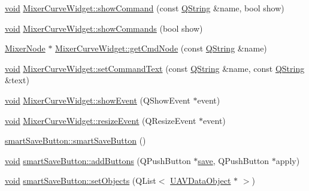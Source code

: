 \begin{DoxyCompactItemize}
\item 
\hyperlink{group___u_a_v_objects_plugin_ga444cf2ff3f0ecbe028adce838d373f5c}{void} \hyperlink{group___u_a_v_object_widget_utils_gab84993af05bfcca9d61a15a48ff85a73}{\-Mixer\-Curve\-Widget\-::show\-Command} (const \hyperlink{group___u_a_v_objects_plugin_gab9d252f49c333c94a72f97ce3105a32d}{\-Q\-String} \&name, bool show)
\item 
\hyperlink{group___u_a_v_objects_plugin_ga444cf2ff3f0ecbe028adce838d373f5c}{void} \hyperlink{group___u_a_v_object_widget_utils_ga29668291c080a26aa2631f3216755094}{\-Mixer\-Curve\-Widget\-::show\-Commands} (bool show)
\item 
\hyperlink{class_mixer_node}{\-Mixer\-Node} $\ast$ \hyperlink{group___u_a_v_object_widget_utils_ga2c1fc49cc5fe0c0b20163b8249d9fabf}{\-Mixer\-Curve\-Widget\-::get\-Cmd\-Node} (const \hyperlink{group___u_a_v_objects_plugin_gab9d252f49c333c94a72f97ce3105a32d}{\-Q\-String} \&name)
\item 
\hyperlink{group___u_a_v_objects_plugin_ga444cf2ff3f0ecbe028adce838d373f5c}{void} \hyperlink{group___u_a_v_object_widget_utils_gaa3ea4c7117915989815218e35875c190}{\-Mixer\-Curve\-Widget\-::set\-Command\-Text} (const \hyperlink{group___u_a_v_objects_plugin_gab9d252f49c333c94a72f97ce3105a32d}{\-Q\-String} \&name, const \hyperlink{group___u_a_v_objects_plugin_gab9d252f49c333c94a72f97ce3105a32d}{\-Q\-String} \&text)
\item 
\hyperlink{group___u_a_v_objects_plugin_ga444cf2ff3f0ecbe028adce838d373f5c}{void} \hyperlink{group___u_a_v_object_widget_utils_gadd0a4729bbf94f44e38a0bcacb353583}{\-Mixer\-Curve\-Widget\-::show\-Event} (\-Q\-Show\-Event $\ast$event)
\item 
\hyperlink{group___u_a_v_objects_plugin_ga444cf2ff3f0ecbe028adce838d373f5c}{void} \hyperlink{group___u_a_v_object_widget_utils_gaa93b51b2d0662bf28c5040a7b7386eed}{\-Mixer\-Curve\-Widget\-::resize\-Event} (\-Q\-Resize\-Event $\ast$event)
\item 
\hyperlink{group___u_a_v_object_widget_utils_gaea82e458c940bce5635289974c09f02f}{smart\-Save\-Button\-::smart\-Save\-Button} ()
\item 
\hyperlink{group___u_a_v_objects_plugin_ga444cf2ff3f0ecbe028adce838d373f5c}{void} \hyperlink{group___u_a_v_object_widget_utils_gaf6869cfd1fefcbd90df4481101aedae0}{smart\-Save\-Button\-::add\-Buttons} (\-Q\-Push\-Button $\ast$\hyperlink{uavobjecttemplate_8m_a79178933c5b76091ca04178d14a5ba98}{save}, \-Q\-Push\-Button $\ast$apply)
\item 
\hyperlink{group___u_a_v_objects_plugin_ga444cf2ff3f0ecbe028adce838d373f5c}{void} \hyperlink{group___u_a_v_object_widget_utils_gabc52b717610cbaa7e592ca114e280a7a}{smart\-Save\-Button\-::set\-Objects} (\-Q\-List$<$ \hyperlink{class_u_a_v_data_object}{\-U\-A\-V\-Data\-Object} $\ast$ $>$)

\end{DoxyCompactItemize}
